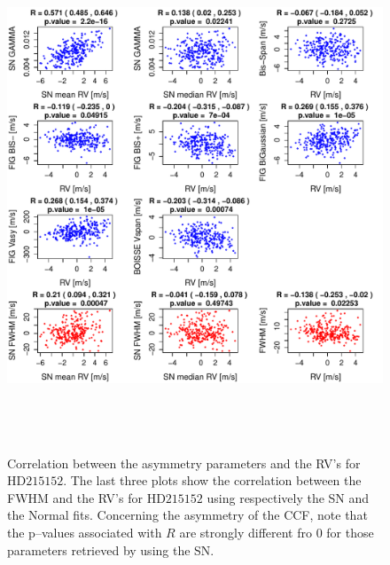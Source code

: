 \documentclass{aa}
\begin{document}
\begin{figure}[htbp]
   \centering
\includegraphics[height = 6in]{HD21515_[4]Comparison_para.pdf}  
   \caption{Correlation between the asymmetry parameters and the RV's for $\text{HD}215152$. The last three plots show the correlation between the FWHM and the RV's for $\text{HD}215152$ using respectively the SN and the Normal fits. Concerning the asymmetry of the CCF, note that the p--values associated with $R$ are strongly different fro $0$ for those parameters retrieved by using the SN.}
   \label{fig:HD215152:corrPlot}
\end{figure}
\end{document}
